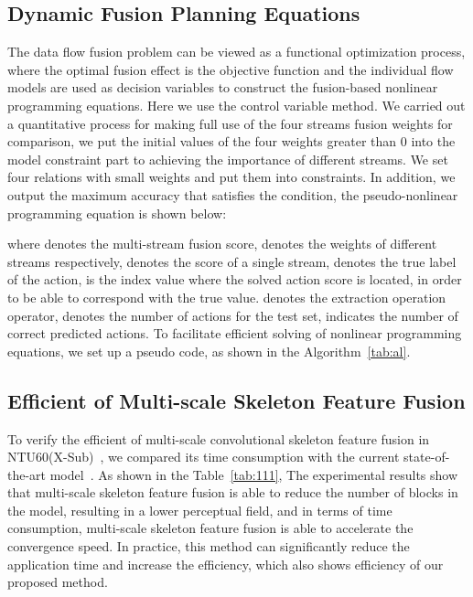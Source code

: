 \documentclass[letterpaper]{article} \usepackage[submission]{aaai23}  \usepackage{times}  \usepackage{helvet}  \usepackage{courier}  \usepackage[hyphens]{url}  \usepackage{graphicx} \urlstyle{rm} \def\UrlFont{\rm}  \usepackage{natbib}  \usepackage{caption} \frenchspacing  \setlength{\pdfpagewidth}{8.5in} \setlength{\pdfpageheight}{11in} \usepackage{algorithm}
\begin{document}
\subsection{Dynamic Fusion Planning Equations}
The data flow fusion problem can be viewed as a functional optimization process, where the optimal fusion effect is the objective function and the individual flow models are used as decision variables to construct the fusion-based nonlinear programming equations. Here we use the control variable method. We carried out a quantitative process for making full use of the four streams fusion weights for comparison, we put the initial values of the four weights greater than 0 into the model constraint part to achieving the importance of different streams.  We set four relations with small weights and put them into constraints. In addition, we output the maximum accuracy that satisfies the condition, the pseudo-nonlinear programming equation is shown below:




where  denotes the multi-stream fusion score,  denotes the weights of different streams respectively,  denotes the score of a single stream,  denotes the true label of the action,  is the index value where the solved action score is located, in order to be able to correspond with the true value.  denotes the extraction operation operator,  denotes the number of actions for the test set,  indicates the number of correct predicted actions. To facilitate efficient solving of nonlinear programming equations, we set up a pseudo code, as shown in the Algorithm~\ref{tab:al}.
\subsection{Efficient of Multi-scale Skeleton Feature Fusion}
 To verify the efficient of multi-scale convolutional skeleton feature fusion in NTU60(X-Sub)~\cite{2016NTU}, we compared its time consumption with the current state-of-the-art model~\cite{2021Channel}. As shown in the Table~\ref{tab:111}, The experimental results show that multi-scale skeleton feature fusion is able to reduce the number of blocks in the model, resulting in a lower perceptual field, and in terms of time consumption, multi-scale skeleton feature fusion is able to accelerate the convergence speed. In practice, this method can significantly reduce the application time and increase the efficiency, which also shows efficiency of our proposed method.
 
\end{document}
